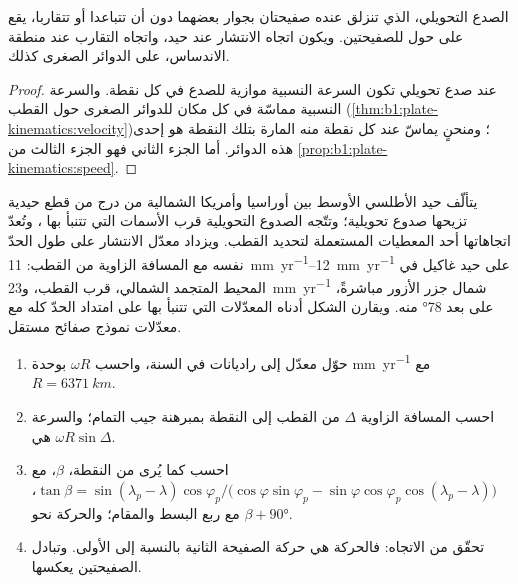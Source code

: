 \begin{proposition}\label{prop:b1:plate-kinematics:transforms}
الصدع التحويلي، الذي تنزلق عنده صفيحتان بجوار بعضهما دون أن تتباعدا أو تتقاربا، يقع على  حول  للصفيحتين. ويكون اتجاه الانتشار عند حيد، واتجاه التقارب عند منطقة الاندساس، على الدوائر الصغرى كذلك.
\end{proposition}

\begin{proof}
عند صدع تحويلي تكون السرعة النسبية موازية للصدع في كل نقطة. والسرعة النسبية مماسّة في كل مكان للدوائر الصغرى حول القطب (\cref{thm:b1:plate-kinematics:velocity})؛ ومنحنٍ يماسّ عند كل نقطة منه  المارة بتلك النقطة هو إحدى هذه الدوائر. أما الجزء الثاني فهو الجزء الثالث من \cref{prop:b1:plate-kinematics:speed}.
\end{proof}

يتألّف حيد الأطلسي الأوسط بين أوراسيا وأمريكا الشمالية من درج من قطع حيدية تزيحها صدوع تحويلية؛ وتتّجه الصدوع التحويلية قرب الأسمات التي تتنبأ بها ، وتُعدّ اتجاهاتها أحد المعطيات المستعملة لتحديد القطب. ويزداد معدّل الانتشار على طول الحدّ نفسه مع المسافة الزاوية من القطب: \qtyrange{11}{12}{mm.yr^{-1}} على حيد غاكيل في المحيط المتجمد الشمالي، قرب القطب، و\qty{23}{mm.yr^{-1}} شمال جزر الأزور مباشرةً، على بعد \ang{78} منه. ويقارن الشكل أدناه المعدّلات التي تتنبأ بها  على امتداد الحدّ كله مع معدّلات نموذج صفائح مستقل.

\begin{method}\label{met:b1:plate-kinematics:velocity}
\begin{enumerate}
  \item حوّل معدّل  إلى راديانات في السنة، واحسب $\omega R$ بوحدة \unit{mm.yr^{-1}} مع $R = \qty{6371}{km}$.
  \item احسب المسافة الزاوية $\Delta$ من القطب إلى النقطة بمبرهنة جيب التمام؛ والسرعة هي $\omega R\sin\Delta$.
  \item احسب  كما يُرى من النقطة، $\beta$، مع
        $\tan\beta = \sin(\lambda_p - \lambda)\cos\varphi_p /
        \bigl(\cos\varphi\sin\varphi_p - \sin\varphi\cos\varphi_p
        \cos(\lambda_p - \lambda)\bigr)$، مع ربع البسط والمقام؛ والحركة نحو $\beta + \ang{90}$.
  \item تحقّق من الاتجاه: فالحركة هي حركة الصفيحة الثانية بالنسبة إلى الأولى. وتبادل الصفيحتين يعكسها.
\end{enumerate}
\end{method}

